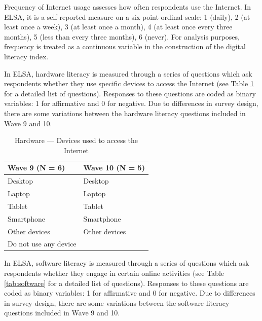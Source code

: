 Frequency of Internet usage assesses how often respondents use the Internet. In ELSA, it is a self-reported measure on a six-point ordinal scale: 1 (daily), 2 (at least once a week), 3 (at least once a month), 4 (at least once every three months), 5 (less than every three months), 6 (never). For analysis purposes, frequency is treated as a continuous variable in the construction of the digital literacy index.

In ELSA, hardware literacy is measured through a series of questions which ask respondents whether they use specific devices to access the Internet (see Table \ref{tab:hardware} for a detailed list of questions). Responses to these questions are coded as binary variables: 1 for affirmative and 0 for negative. Due to differences in survey design, there are some variations between the hardware literacy questions included in Wave 9 and 10. 

\begin{table}[h!]
    \centering
    \caption{Hardware --- Devices used to access the Internet}
    \label{tab:hardware}
    \begin{tabular}{ll}
        \toprule
        Wave 9 (N = 6) & Wave 10 (N = 5) \\
        \midrule
        Desktop & Desktop \\
        Laptop & Laptop \\
        Tablet & Tablet \\
        Smartphone & Smartphone \\
        Other devices & Other devices \\
        Do not use any device & \\
        \bottomrule
    \end{tabular}
\end{table}

In ELSA, software literacy is measured through a series of questions which ask respondents whether they engage in certain online activities (see Table \ref{tab:software} for a detailed list of questions). Responses to these questions are coded as binary variables: 1 for affirmative and 0 for negative. Due to differences in survey design, there are some variations between the software literacy questions included in Wave 9 and 10.

